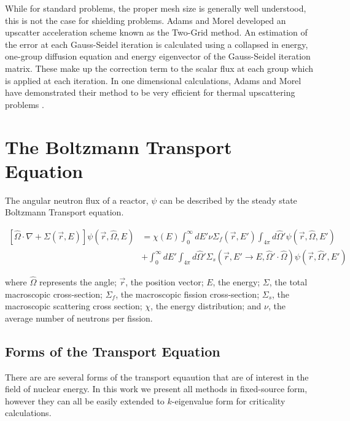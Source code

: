 \par
While for standard problems, the proper mesh size is generally well understood, this is not the case for shielding problems. Adams and Morel developed an upscatter acceleration scheme known as the Two-Grid method. An estimation of the error at each Gauss-Seidel iteration is calculated using a collapsed in energy, one-group diffusion equation and energy eigenvector of the Gauss-Seidel iteration matrix. These make up the correction term to the scalar flux at each group which is applied at each iteration. In one dimensional calculations, Adams and Morel have demonstrated their method to be very efficient for thermal upscattering problems \cite{morel-upscat}.

\section{The Boltzmann Transport Equation}
The angular neutron flux of a reactor, $\psi$ can be described by the steady state Boltzmann Transport equation.

\begin{equation}
\begin{split}
 [\hat{\Omega} \cdot \nabla + \Sigma(\vec{r}, E)]\psi(\vec{r}, \hat{\Omega}, E) &= \chi(E) \int_0^\infty dE' \nu \Sigma_{f}(\vec{r}, E') \int_{4\pi} d\hat{\Omega}'\psi(\vec{r}, \hat{\Omega}, E') \\   &+ \int_0^\infty dE' \int_{4\pi} d\hat{\Omega}' \Sigma_s(\vec{r}, E' \rightarrow E, \hat{\Omega}' \cdot \hat{\Omega})\psi(\vec{r}, \hat{\Omega}', E')   
\end{split}
\label{eq:transport}
\end{equation}


where $\hat{\Omega}$ represents the angle; $\vec{r}$, the position vector; $E$, the energy; $\Sigma$, the total macroscopic cross-section; $\Sigma_f$, the macroscopic fission cross-section; $\Sigma_s$, the macroscopic scattering cross section; $\chi$, the energy distribution; and $\nu$, the average number of neutrons per fission. 

\subsection{Forms of the Transport Equation}
There are are several forms of the transport equaution that are of interest in the field of nuclear energy. In this work we present all methods in fixed-source form, however they can all be easily extended to $k$-eigenvalue form for criticality calculations. 

